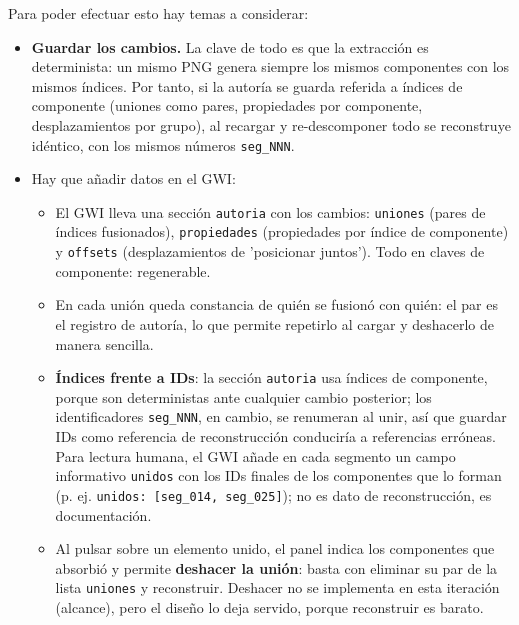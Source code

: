 Para poder efectuar esto hay temas a considerar:

\begin{itemize}
	\item \textbf{Guardar los cambios.} La clave de todo es que la extracción es determinista: un mismo PNG genera siempre los mismos componentes con los mismos índices. Por tanto, si la autoría se guarda referida a índices de componente (uniones como pares, propiedades por componente, desplazamientos por grupo), al recargar y re-descomponer todo se reconstruye idéntico, con los mismos números \texttt{seg\_NNN}.
	\item Hay que añadir datos en el GWI:
	\begin{itemize}
		\item El GWI lleva una sección \texttt{autoria} con los cambios: \texttt{uniones} (pares de índices fusionados), \texttt{propiedades} (propiedades por índice de componente) y \texttt{offsets} (desplazamientos de 'posicionar juntos'). Todo en claves de componente: regenerable.
		\item En cada unión queda constancia de quién se fusionó con quién: el par es el registro de autoría, lo que permite repetirlo al cargar y deshacerlo de manera sencilla.
		\item \textbf{Índices frente a IDs}: la sección \texttt{autoria} usa índices de componente, porque son deterministas ante cualquier cambio posterior; los identificadores \texttt{seg\_NNN}, en cambio, se renumeran al unir, así que guardar IDs como referencia de reconstrucción conduciría a referencias erróneas. Para lectura humana, el GWI añade en cada segmento un campo informativo \texttt{unidos} con los IDs finales de los componentes que lo forman (p. ej. \texttt{unidos: [seg\_014, seg\_025]}); no es dato de reconstrucción, es documentación.
		\item Al pulsar sobre un elemento unido, el panel indica los componentes que absorbió y permite \textbf{deshacer la unión}: basta con eliminar su par de la lista \texttt{uniones} y reconstruir. Deshacer no se implementa en esta iteración (alcance), pero el diseño lo deja servido, porque reconstruir es barato.
	\end{itemize}
\end{itemize}

